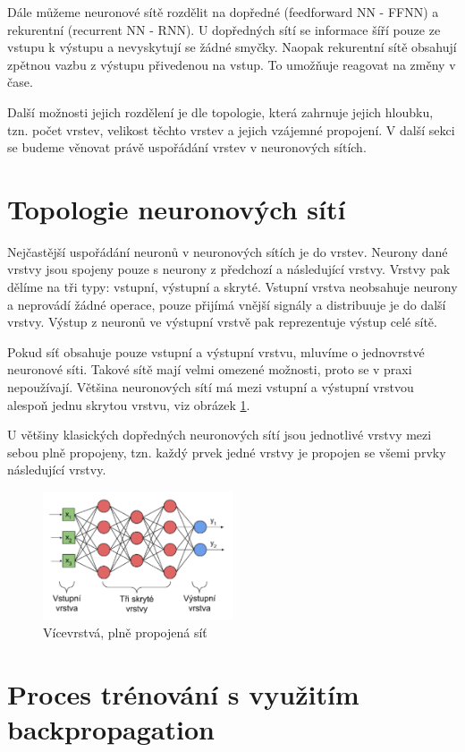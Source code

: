 Dále můžeme neuronové sítě rozdělit na dopředné (feedforward NN - FFNN) a
rekurentní (recurrent NN - RNN). U dopředných sítí se informace šíří pouze ze
vstupu k výstupu a nevyskytují se žádné smyčky. Naopak rekurentní sítě obsahují
zpětnou vazbu z výstupu přivedenou na vstup. To umožňuje reagovat na změny v
čase.

Další možnosti jejich rozdělení je dle topologie, která zahrnuje jejich
hloubku, tzn. počet vrstev, velikost těchto vrstev a jejich vzájemné propojení.
V další sekci se budeme věnovat právě uspořádání vrstev v neuronových sítích.

\section{Topologie neuronových sítí}
Nejčastější uspořádání neuronů v neuronových sítích je do vrstev. Neurony dané
vrstvy jsou spojeny pouze s neurony z předchozí a následující vrstvy. Vrstvy
pak dělíme na tři typy: vstupní, výstupní a skryté. Vstupní vrstva neobsahuje
neurony a neprovádí žádné operace, pouze přijímá vnější signály a distribuuje
je do další vrstvy. Výstup z neuronů ve výstupní vrstvě pak reprezentuje výstup
celé sítě.

Pokud síť obsahuje pouze vstupní a výstupní vrstvu, mluvíme o jednovrstvé
neuronové síti. Takové sítě mají velmi omezené možnosti, proto se v praxi
nepoužívají. Většina neuronových sítí má mezi vstupní a výstupní vrstvou
alespoň jednu skrytou vrstvu, viz obrázek \ref{fig:layers}.

U většiny klasických dopředných neuronových sítí jsou jednotlivé vrstvy mezi
sebou plně propojeny, tzn. každý prvek jedné vrstvy je propojen se všemi prvky
následující vrstvy.

\begin{figure}[]
    \centering
    \includegraphics[width=0.5\textwidth]{Figures/layers.png}
    \caption{Vícevrstvá, plně propojená síť \cite{lagan}}
    \label{fig:layers}
\end{figure}

\section{Proces trénování s využitím backpropagation}

